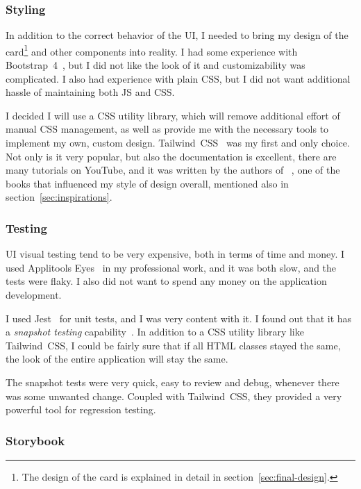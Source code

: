 \subsubsection{Styling}\label{sec:ui-styling}

In addition to the correct behavior of the UI,
I needed to bring my design of the card\footnote{
  The design of the card
  is explained in detail
  in section~\ref{sec:final-design}.
} and other components
into reality.
I had some experience with Bootstrap~4~\cite{otto_bootstrap_2018},
but I did not like the look of it
and customizability was complicated.
I also had experience with plain CSS,
but I did not want additional hassle
of maintaining both JS and CSS.

I decided I will use a CSS utility library,
which will remove additional effort
of manual CSS management,
as well as provide me with the necessary tools
to implement my own, custom design.
Tailwind~CSS~\cite{wathan_tailwind_2022}
was my first and only choice.
Not only is it very popular,
but also the documentation is excellent,
there are many tutorials on YouTube,
and it was written by the authors
of ~\cite{wathan_refactoring_2018},
one of the books that influenced
my style of design overall,
mentioned also in section~\ref{sec:inspirations}.

\subsubsection{Testing}\label{sec:ui-testing}

UI visual testing tend to be very expensive,
both in terms of time and money.
I used Applitools Eyes~\cite{applitools_applitools_2022}
in my professional work,
and it was both slow,
and the tests were flaky.
I also did not want to spend any money
on the application development.

I used Jest~\cite{bekkhus_jest_2022} for unit tests,
and I was very content with it.
I found out that it has
a \textit{snapshot testing} capability~\cite{bekkhus_snapshot_2022}.
In addition to a CSS utility library
like Tailwind~CSS,
I could be fairly sure
that if all HTML classes stayed the same,
the look of the entire application
will stay the same.

The snapshot tests were very quick,
easy to review and debug,
whenever there was some unwanted change.
Coupled with Tailwind~CSS,
they provided a very powerful tool
for regression testing.

\subsubsection{Storybook}\label{sec:storybook}

